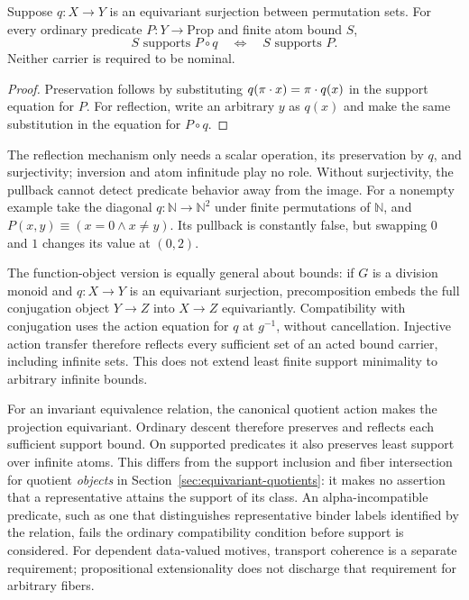 \begin{proposition}
\label{prop:predicate-pullback}
Suppose $q:X\to Y$ is an equivariant surjection between permutation sets.
For every ordinary predicate $P:Y\to\mathrm{Prop}$ and finite atom bound $S$,
\[
  S\text{ supports }P\circ q
  \quad\Longleftrightarrow\quad
  S\text{ supports }P.
\]
Neither carrier is required to be nominal.
\end{proposition}

\begin{proof}
Preservation follows by substituting
$q(\pi\mathbin{\cdot} x)=\pi\mathbin{\cdot} q(x)$ in the support equation for $P$.
For reflection, write an arbitrary $y$ as $q(x)$ and make the same
substitution in the equation for $P\circ q$.
\end{proof}

The reflection mechanism only needs a scalar operation, its preservation by
$q$, and surjectivity; inversion and atom infinitude play no role. Without
surjectivity, the pullback cannot detect predicate behavior away from the image.
For a nonempty example take the diagonal $q:\mathbb N\to\mathbb N^2$ under
finite permutations of $\mathbb N$, and
$P(x,y)\equiv(x=0\wedge x\ne y)$. Its pullback is constantly false, but
swapping $0$ and $1$ changes its value at $(0,2)$.

The function-object version is equally general about bounds: if $G$ is a
division monoid and $q:X\to Y$ is an equivariant surjection, precomposition
embeds the full conjugation object $Y\to Z$ into $X\to Z$ equivariantly.
Compatibility with conjugation uses the action equation for $q$ at $g^{-1}$,
without cancellation. Injective action transfer therefore reflects every
sufficient set of an acted bound carrier, including infinite sets. This does
not extend least finite support minimality to arbitrary infinite bounds.

For an invariant equivalence relation, the canonical quotient action makes
the projection equivariant. Ordinary descent therefore preserves and reflects
each sufficient support bound. On supported predicates it also preserves least
support over infinite atoms. This differs from the support inclusion and fiber
intersection for quotient \emph{objects} in Section~\ref{sec:equivariant-quotients}:
it makes no assertion that a representative attains the support of its class.
An alpha-incompatible predicate, such as one that distinguishes representative
binder labels identified by the relation, fails the ordinary compatibility
condition before support is considered. For dependent data-valued motives,
transport coherence is a separate requirement; propositional extensionality
does not discharge that requirement for arbitrary fibers.

